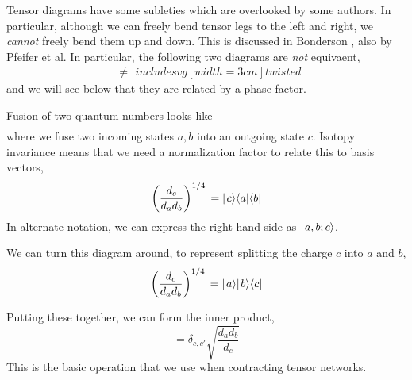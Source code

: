 \documentclass[12pt]{article}
\begin{document}
Tensor diagrams have some subleties which are overlooked by some authors. In particular, although
we can freely bend tensor legs to the left and right, we \emph{cannot} freely bend them up and down.
This is discussed in Bonderson \cite{Bonderson}, also by Pfeifer et al\cite{AnyonDMRG}.
In particular, the following two diagrams are \emph{not} equivaent,
\begin{equation}
\begin{gathered}

\end{gathered}
\neq
\begin{gathered}
  includesvg[width=3cm]{twisted}
\end{gathered}
\label{eq:TwistedTime}
\end{equation}
and we will see below that they are related by a phase factor.

Fusion of two quantum numbers looks like
\begin{equation}
\begin{gathered}

\end{gathered}
\end{equation}
where we fuse two incoming states $a,b$ into an outgoing state $c$. 
Isotopy invariance means that we need a normalization factor to relate this to basis vectors,
\begin{equation}
\left(\frac{d_c}{d_a d_b} \right)^{1/4}
\begin{gathered}

\end{gathered}
= \ket{c} \bra{a}\bra{b}
\end{equation}
In alternate notation, we can express the right hand side as $\hbox{$\mid \! {a,b;c} \rangle$}$.

We can turn this diagram around, to represent splitting the charge $c$ into $a$ and $b$,
\begin{equation}
\left(\frac{d_c}{d_a d_b} \right)^{1/4}
\begin{gathered}

\end{gathered}
= \ket{a}\ket{b} \bra{c}
\end{equation}

Putting these together, we can form the inner product,
\begin{equation}
\begin{gathered}

\end{gathered}
= \delta_{c,c'} \sqrt{\frac{d_a d_b}{d_c}}
\begin{gathered}

\end{gathered}
\end{equation}
This is the basic operation that we use when contracting tensor networks.
\end{document}
